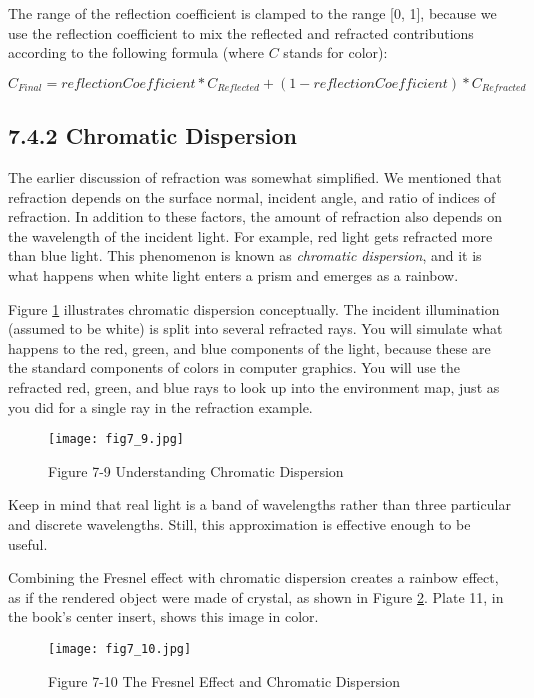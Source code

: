 \documentclass[../main.tex]{subfiles}
\begin{document}
The range of the reflection coefficient is clamped to the range [0, 1], because we use the reflection coefficient to mix the reflected and refracted contributions according to the following formula (where $C$ stands for color):

$C_{Final} = reflectionCoefficient * C_{Reflected} + (1 - reflectionCoefficient) * C_{Refracted}$

\subsection{7.4.2 Chromatic Dispersion}

The earlier discussion of refraction was somewhat simplified. We mentioned that refraction depends on the surface normal, incident angle, and ratio of indices of refraction. In addition to these factors, the amount of refraction also depends on the wavelength of the incident light. For example, red light gets refracted more than blue light. This phenomenon is known as \textit{chromatic dispersion}, and it is what happens when white light enters a prism and emerges as a rainbow.

Figure \ref{fig:7-9} illustrates chromatic dispersion conceptually. The incident illumination (assumed to be white) is split into several refracted rays. You will simulate what happens to the red, green, and blue components of the light, because these are the standard components of colors in computer graphics. You will use the refracted red, green, and blue rays to look up into the environment map, just as you did for a single ray in the refraction example.

\begin{figure}
    \centering
    \texttt{[image: fig7\_9.jpg]}
    \caption{Figure 7-9 Understanding Chromatic Dispersion}
    \label{fig:7-9}
\end{figure}

Keep in mind that real light is a band of wavelengths rather than three particular and discrete wavelengths. Still, this approximation is effective enough to be useful.

Combining the Fresnel effect with chromatic dispersion creates a rainbow effect, as if the rendered object were made of crystal, as shown in Figure \ref{fig:7-10}. Plate 11, in the book's center insert, shows this image in color.

\begin{figure}
    \centering
    \texttt{[image: fig7\_10.jpg]}
    \caption{Figure 7-10 The Fresnel Effect and Chromatic Dispersion}
    \label{fig:7-10}
\end{figure}
\end{document}
